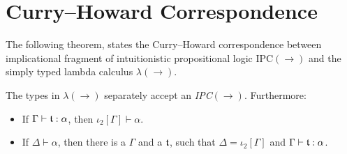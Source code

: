 \section{Curry--Howard Correspondence}

The following theorem, states the Curry--Howard correspondence between implicational fragment of intuitionistic propositional logic IPC$(\rightarrow)$ and the simply typed lambda calculus $\lambda(\rightarrow)$.

\begin{theorem}
The types in $\lambda(\rightarrow)$ separately accept an \emph{IPC}$(\rightarrow)$. Furthermore:
\begin{itemize}
    \item If $\Gamma \vdash \mathfrak{t} : \alpha$, then $\iota_2[\Gamma] \vdash \alpha$.
    \item If $\Delta \vdash \alpha$, then there is a $\Gamma$ and a $\mathfrak{t}$, such that $\Delta = \iota_2[\Gamma]$ and $\Gamma \vdash \mathfrak{t} : \alpha$.
\end{itemize}
\end{theorem}
